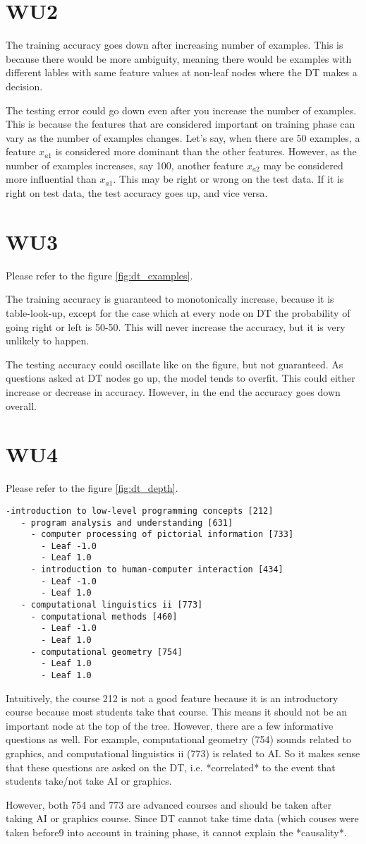 \section*{WU2}
The training accuracy goes down after increasing number of examples. This is because there would be more ambiguity, meaning there would be examples with different lables with same feature values at non-leaf nodes where the DT makes a decision.

The testing error could go down even after you increase the number of examples. This is because the features that are considered important on training phase can vary as the number of examples changes. Let's say, when there are 50 examples, a feature $x_{a1}$ is considered more dominant than the other features. However, as the number of examples increases, say 100, another feature $x_{a2}$ may be considered more influential than $x_{a1}$. This may be right or wrong on the test data. If it is right on test data, the test accuracy goes up, and vice versa.

\section*{WU3}

Please refer to the figure \ref{fig:dt_examples}.

The training accuracy is guaranteed to monotonically increase, because it is table-look-up, except for the case which at every node on DT the probability of going right or left is 50-50. This will never increase the accuracy, but it is very unlikely to happen. 

The testing accuracy could oscillate like on the figure, but not guaranteed. As questions asked at DT nodes go up, the model tends to overfit. This could either increase or decrease in accuracy. However, in the end the accuracy goes down overall.

\section*{WU4}

Please refer to the figure \ref{fig:dt_depth}.
  \begin{verbatim}
-introduction to low-level programming concepts [212]
   - program analysis and understanding [631]
     - computer processing of pictorial information [733]
       - Leaf -1.0
       - Leaf 1.0
     - introduction to human-computer interaction [434]
       - Leaf -1.0
       - Leaf 1.0
   - computational linguistics ii [773]
     - computational methods [460]
       - Leaf -1.0
       - Leaf 1.0
     - computational geometry [754]
       - Leaf 1.0
       - Leaf 1.0
  \end{verbatim}
Intuitively, the course 212 is not a good feature because it is an introductory course because most students take that course. This means it should not be an important node at the top of the tree. However, there are a few informative questions as well. For example, computational geometry (754) sounds related to graphics, and  computational linguistics ii (773) is related to AI. So it makes sense that these questions are asked on the DT, i.e. *correlated* to the event that students take/not take AI or graphics. 

However, both 754 and 773 are advanced courses and should be taken after taking AI or graphics course. Since DT cannot take time data (which couses were taken before9 into account in training phase, it cannot explain the *causality*.

